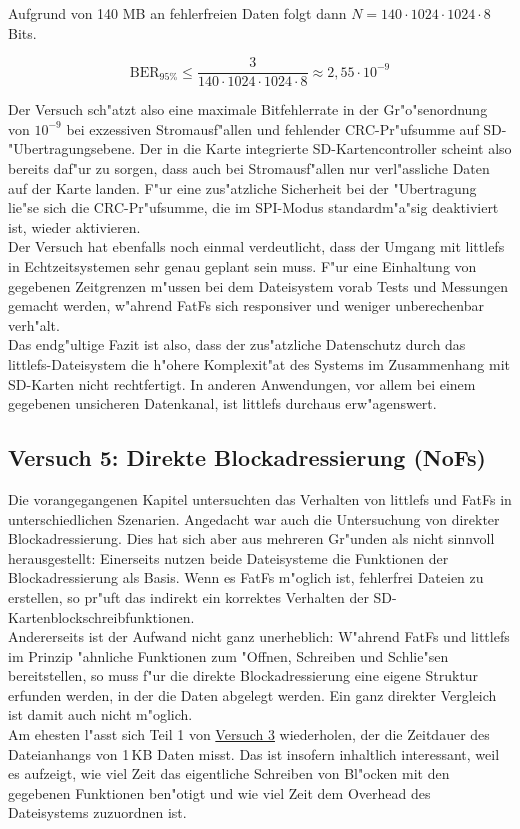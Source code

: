 \documentclass[11pt]{article}
\begin{document}
\noindent
Aufgrund von 140 MB an fehlerfreien Daten folgt dann $N=140\cdot1024\cdot1024\cdot8$ Bits.

$$
\text{BER}_{95\%} \le \frac{3}{140\cdot1024\cdot1024\cdot8} \approx 2{,}55 \cdot 10^{-9}
$$

Der Versuch sch"atzt also eine maximale Bitfehlerrate in der Gr"o"senordnung von $10^{-9}$ bei
exzessiven Stromausf"allen und fehlender CRC-Pr"ufsumme auf SD-"Ubertragungsebene. Der 
in die Karte integrierte SD-Kartencontroller scheint also bereits daf"ur zu sorgen,
dass auch bei Stromausf"allen nur verl"assliche Daten auf der Karte landen. F"ur eine
zus"atzliche Sicherheit bei der "Ubertragung lie"se sich die CRC-Pr"ufsumme, die im SPI-Modus
standardm"a"sig deaktiviert ist, wieder aktivieren.\\
Der Versuch hat ebenfalls noch einmal verdeutlicht, dass der Umgang mit littlefs 
in Echtzeitsystemen sehr genau geplant sein muss. F"ur eine Einhaltung von gegebenen Zeitgrenzen m"ussen
bei dem Dateisystem vorab Tests und Messungen gemacht werden, w"ahrend FatFs sich responsiver und weniger
unberechenbar verh"alt.\\

Das endg"ultige Fazit ist also, dass der zus"atzliche Datenschutz durch das littlefs-Dateisystem die h"ohere Komplexit"at
des Systems im Zusammenhang mit SD-Karten nicht rechtfertigt. In anderen Anwendungen, vor allem bei einem gegebenen unsicheren Datenkanal,
ist littlefs durchaus erw"agenswert. 

\subsection{Versuch 5: Direkte Blockadressierung (NoFs)}\label{sec:v5}
Die vorangegangenen Kapitel untersuchten das Verhalten von littlefs und FatFs in unterschiedlichen Szenarien.
Angedacht war auch die Untersuchung von direkter Blockadressierung. Dies hat sich aber aus mehreren Gr"unden
als nicht sinnvoll herausgestellt: Einerseits nutzen beide Dateisysteme die Funktionen der Blockadressierung 
als Basis.
Wenn es FatFs m"oglich ist, fehlerfrei Dateien zu erstellen, so pr"uft das indirekt ein korrektes
Verhalten der SD-Kartenblockschreibfunktionen. \\
Andererseits ist der Aufwand nicht ganz unerheblich: W"ahrend FatFs und littlefs im Prinzip "ahnliche
Funktionen zum "Offnen, Schreiben und Schlie"sen bereitstellen, so muss f"ur die direkte
Blockadressierung eine eigene Struktur erfunden werden, in der die Daten abgelegt werden.
Ein ganz direkter Vergleich ist damit auch nicht m"oglich. \\
Am ehesten l"asst sich Teil 1 von \hyperref[sec:v3]{Versuch 3} wiederholen, der die 
Zeitdauer des Dateianhangs von 1\,KB Daten misst. Das ist insofern inhaltlich interessant,
weil es aufzeigt, wie viel Zeit das eigentliche Schreiben von Bl"ocken mit den gegebenen Funktionen ben"otigt
und wie viel Zeit dem Overhead des Dateisystems zuzuordnen ist. \\ 
\end{document}
